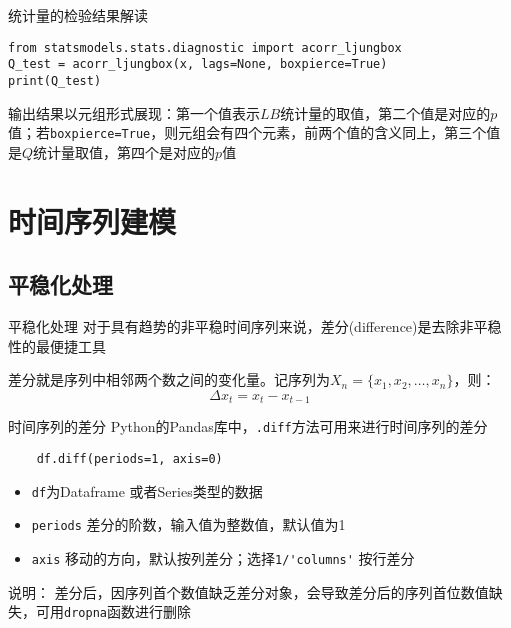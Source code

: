 \documentclass[t]{beamer}
\begin{document}
\begin{frame}[fragile]{统计量的检验结果解读}
\begin{lstlisting}
from statsmodels.stats.diagnostic import acorr_ljungbox
Q_test = acorr_ljungbox(x, lags=None, boxpierce=True)
print(Q_test)
\end{lstlisting}
输出结果以元组形式展现：第一个值表示$LB$统计量的取值，第二个值是对应的$p$值；若\verb|boxpierce=True|，则元组会有四个元素，前两个值的含义同上，第三个值是$Q$统计量取值，第四个是对应的$p$值
\end{frame}

\section{时间序列建模}
\subsection{平稳化处理}
\begin{frame}[fragile]{平稳化处理}
对于具有趋势的非平稳时间序列来说，差分(difference)是去除非平稳性的最便捷工具

差分就是序列中相邻两个数之间的变化量。记序列为$X_n=\{x_1,x_2,\ldots,x_n\}$，则：
\[\Delta x_t=x_t-x_{t-1}\]

\begin{center}
\end{center}

\end{frame}


\begin{frame}[fragile]{时间序列的差分}
Python的Pandas库中，\verb|.diff|方法可用来进行时间序列的差分
\begin{lstlisting}
    df.diff(periods=1, axis=0)
\end{lstlisting}
\begin{itemize}
    \item \verb|df|为Dataframe 或者Series类型的数据
    \item \verb|periods| 差分的阶数，输入值为整数值，默认值为1
    \item \verb|axis| 移动的方向，默认按列差分；选择\verb|1/'columns'| 按行差分
\end{itemize}

\begin{block}{说明：}
    差分后，因序列首个数值缺乏差分对象，会导致差分后的序列首位数值缺失，可用\verb|dropna|函数进行删除
\end{block}
\end{frame}
\end{document}
